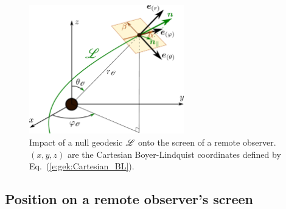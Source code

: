 \begin{figure}
\centerline{\includegraphics[width=0.6\textwidth]{gik_obs_screen.pdf}}
\caption[]{\label{f:gik:obs_screen} \footnotesize
Impact of a null geodesic $\mathscr{L}$ onto the screen of a remote observer. $(x,y,z)$ are the Cartesian Boyer-Lindquist coordinates
defined by Eq.~(\ref{e:gek:Cartesian_BL}).
}
\end{figure}

\subsection{Position on a remote observer's screen}

